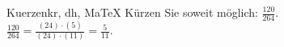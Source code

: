 \begin{MAufgabe}{Kuerzen}{kr, dh, MaTeX}
K\"urzen Sie soweit m\"oglich: $\frac{120}{264}$.\\ 
\ifLsg\MLoesung
\quad $\frac{120}{264}=\frac{(24)\cdot(5)}{(24)\cdot(11)}=\frac{5}{11}$.\else\relax\fi
 \end{MAufgabe}